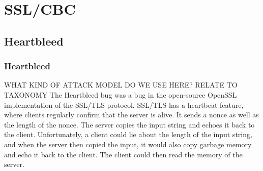 \documentclass[14pt]{beamer}
\begin{document}
    
\section{SSL/CBC}
    \subsection{Heartbleed}
        \begin{frame}
            \frametitle{Heartbleed}

                WHAT KIND OF ATTACK MODEL DO WE USE HERE? RELATE TO TAXONOMY
                The Heartbleed bug was a bug in the open-source OpenSSL implementation of the SSL/TLS protocol. SSL/TLS has a heartbeat feature, where clients regularly confirm that the server is alive. It sends a nonce as well as the length of the nonce. The server copies the input string and echoes it back to the client. Unfortunately, a client could lie about the length of the input string, and when the server then copied the input, it would also copy garbage memory and echo it back to the client. The client could then read the memory of the server. 
        \end{frame}

\end{document}

